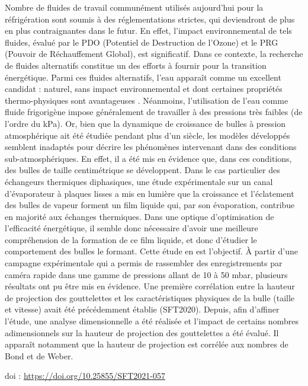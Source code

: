 {\normalsize
Nombre de fluides de travail communément utilisés aujourd'hui pour la réfrigération sont soumis à des réglementations strictes, qui deviendront de plus en plus contraignantes dans le futur. En effet, l'impact environnemental de tels fluides, évalué par le PDO (Potentiel de Destruction de l'Ozone) et le PRG (Pouvoir de Réchauffement Global), est significatif. Dans ce contexte, la recherche de fluides alternatifs constitue un des efforts à fournir pour la transition énergétique. Parmi ces fluides alternatifs, l'eau apparaît comme un excellent candidat : naturel, sans impact environnemental et dont certaines propriétés thermo-physiques sont avantageuses . Néanmoins, l'utilisation de l'eau comme fluide frigorigène impose généralement de travailler à des pressions très faibles (de l'ordre du kPa). Or, bien que la dynamique de croissance de bulles à pression atmosphérique ait été étudiée pendant plus d'un siècle, les modèles développés semblent inadaptés pour décrire les phénomènes intervenant dans des conditions sub-atmosphériques. En effet, il a été mis en évidence que, dans ces conditions, des bulles de taille centimétrique se développent. Dans le cas particulier des échangeurs thermiques diphasiques, une étude expérimentale sur un canal d'évaporateur à plaques lisses a mis en lumière que la croissance et l'éclatement des bulles de vapeur forment un film liquide qui, par son évaporation, contribue en majorité aux échanges thermiques. Dans une optique d'optimisation de l'efficacité énergétique, il semble donc nécessaire d'avoir une meilleure compréhension de la formation de ce film liquide, et donc d'étudier le comportement des bulles le formant. Cette étude en est l'objectif. À partir d'une campagne expérimentale qui a permis de rassembler des enregistrements par caméra rapide dans une gamme de pressions allant de 10 à 50 mbar, plusieurs résultats ont pu être mis en évidence. Une première corrélation entre la hauteur de projection des gouttelettes et les caractéristiques physiques de la bulle (taille et vitesse) avait été précédemment établie (SFT2020). Depuis, afin d'affiner l'étude, une analyse dimensionnelle a été réalisée et l'impact de certains nombres adimensionnels sur la hauteur de projection des gouttelettes a été évalué. Il apparaît notamment que la hauteur de projection est corrélée aux nombres de Bond et de Weber.

 \vfill doi : \url{https://doi.org/10.25855/SFT2021-057}

}
 
